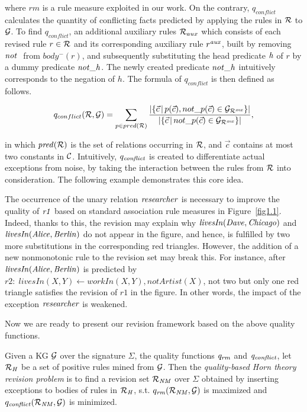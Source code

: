 where $rm$ is a rule measure exploited in our work. On the contrary, $q_{conflict}$ calculates the quantity of conflicting facts predicted by applying the rules in $\mathcal{R}$ to $\mathcal{G}$. To find $q_{conflict}$, an additional auxiliary rules $\mathcal{R}_{aux}$ which consists of each revised rule $r \in \mathcal{R}$ and its corresponding auxiliary rule $r^{\mathit{aux}}$, built by removing $\naf$ from $body^-(r)$, and subsequently substituting the head predicate $\mathit{h}$ of $r$ by a dummy predicate $\mathit{not\_h}$. The newly created predicate $\mathit{not\_h}$ intuitively corresponds to the negation of $h$. The formula of $q_{conflict}$ is then defined as follows.

\begin{equation}
q_{conflict}(\mathcal{R},\mathcal{G})=\sum_{p\in pred(\mathcal{R})} \dfrac{|\{ \vec{c}\,|\,p(\vec{c}),not\_p(\vec{c})\in \mathcal{G}_{\mathcal{R}^{\mathit{aux}}}\} |}{|\{ \vec{c}\,|\,not\_p(\vec{c})\in \mathcal{G}_{\mathcal{R}^{\mathit{aux}}}\} |}
\label{eq:conflict},
\end{equation}

in which $\mathit{pred(\mathcal{R})}$ is the set of relations occurring in $\mathcal{R}$, and $\vec{c}$ contains at most two constants in $\mathcal{C}$. Intuitively, $q_{\mathit{conflict}}$ is created to differentiate actual exceptions from noise, by taking the interaction between the rules from $\mathcal{R}$ into consideration. The following example demonstrates this core idea.

\begin{example}

The occurrence of the unary relation $\mathit{researcher}$ is necessary to improve the quality of $\mathit{r1}$ based on standard association rule measures in Figure~\ref{fig1.1}. Indeed, thanks to this, the revision may explain why $\mathit{livesIn(Dave,Chicago)}$ and $\mathit{livesIn(Alice,Berlin)}$ do not appear in the figure, and hence, is fulfilled by two more substitutions in the corresponding red triangles. However, the addition of a new nonmonotonic rule to the revision set may break this. For instance, after $\mathit{livesIn(Alice,Berlin)}$ is predicted by $r2:\; livesIn(X,Y)\leftarrow workIn(X,Y), not Artist(X)$, not two but only one red triangle satisfies the revision of $r1$ in the figure. In other words, the impact of the exception $\mathit{researcher}$ is weakened.
\end{example}

Now we are ready to present our revision framework based on the above quality functions.

\begin{definition} \label{def:qhtr}
Given a KG $\mathcal{G}$ over the signature $\Sigma$, the quality functions $\mathit{q_{rm}}$ and $\mathit{q_{conflict}}$, let $\mathcal{R}_{\mathit{H}}$ be a set of positive rules mined from $\mathcal{G}$. Then the \emph{quality-based Horn theory revision problem} is to find a revision set $\mathcal{R}_{\mathit{NM}}$ over $\Sigma$ obtained by inserting exceptions to bodies of rules in $\mathcal{R}_{\mathit{H}}$, s.t. $q_{\mathit{rm}}(\mathcal{R}_{\mathit{NM}},\mathcal{G})$ is maximized and $q_{\mathit{conflict}}(\mathcal{R}_{\mathit{NM}},\mathcal{G})$ is minimized.
\end{definition}

